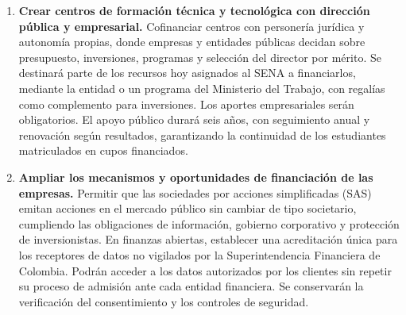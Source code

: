 \begin{mdframed}[linewidth=1pt,linecolor=gray!60,backgroundcolor=gray!6,
  innertopmargin=12pt,innerbottommargin=12pt,innerleftmargin=14pt,innerrightmargin=14pt]
\begin{enumerate}[label=\arabic*.,leftmargin=*,itemsep=4pt,parsep=0pt,topsep=6pt]
\item \textbf{Crear centros de formación técnica y tecnológica con dirección pública y empresarial.} Cofinanciar centros con personería jurídica y autonomía propias, donde empresas y entidades públicas decidan sobre presupuesto, inversiones, programas y selección del director por mérito. Se destinará parte de los recursos hoy asignados al SENA a financiarlos, mediante la entidad o un programa del Ministerio del Trabajo, con regalías como complemento para inversiones. Los aportes empresariales serán obligatorios. El apoyo público durará seis años, con seguimiento anual y renovación según resultados, garantizando la continuidad de los estudiantes matriculados en cupos financiados.
\item \textbf{Ampliar los mecanismos y oportunidades de financiación de las empresas.} Permitir que las sociedades por acciones simplificadas (SAS) emitan acciones en el mercado público sin cambiar de tipo societario, cumpliendo las obligaciones de información, gobierno corporativo y protección de inversionistas. En finanzas abiertas, establecer una acreditación única para los receptores de datos no vigilados por la Superintendencia Financiera de Colombia. Podrán acceder a los datos autorizados por los clientes sin repetir su proceso de admisión ante cada entidad financiera. Se conservarán la verificación del consentimiento y los controles de seguridad.

\end{enumerate}
\end{mdframed}
